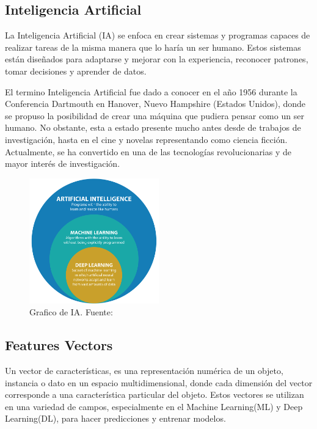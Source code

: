 

\subsection{Inteligencia Artificial}
La Inteligencia Artificial (IA) se enfoca en crear sistemas y programas capaces de realizar tareas de la misma manera que lo haría un ser humano. Estos sistemas están diseñados para adaptarse y mejorar con la experiencia, reconocer patrones, tomar decisiones y aprender de datos. 

El termino Inteligencia Artificial fue dado a conocer en el año 1956 durante la Conferencia Dartmouth en Hanover, Nuevo Hampshire (Estados Unidos), donde se propuso la posibilidad de crear una máquina que pudiera pensar como un ser humano.  No obstante, esta a estado presente mucho antes desde de trabajos de investigación, hasta en el cine y novelas representando como ciencia ficción. 
Actualmente, se ha convertido en una de las tecnologías revolucionarias y de mayor interés de investigación.


\begin{figure}[h]
	\begin{center}
		\includegraphics[width=0.5\textwidth]{2/figuras/imagenes/IA_ML_DL.png}
		\caption{Grafico de IA. Fuente: \cite{IA_}}
		\label{1:fig 16}
	\end{center}
\end{figure}

\subsection{Features Vectors}
Un vector de características, es una representación numérica de un objeto, instancia o dato en un espacio multidimensional, donde cada dimensión del vector corresponde a una característica particular del objeto. Estos vectores se utilizan en una variedad de campos, especialmente en el Machine Learning(ML) y Deep Learning(DL), para hacer predicciones y entrenar modelos.

